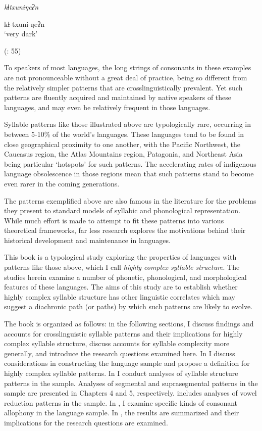 \ea\label{ex:1.5}

\textit{kɬtxuniŋeʔn}

kɬ-txuni-ŋeʔn\\
\glt ‘very dark’

(\citealt{GeorgVolodin1999}: 55)
\z

To speakers of most languages, the long strings of consonants in these examples are not pronounceable without a great deal of practice, being so different from the relatively simpler patterns that are crosslinguistically prevalent. Yet such patterns are fluently acquired and maintained by native speakers of these languages, and may even be relatively frequent in those languages.

  Syllable patterns like those illustrated above are typologically rare, occurring in between 5-10\% of the world’s languages. These languages tend to be found in close geographical proximity to one another, with the Pacific Northwest, the Caucasus region, the Atlas Mountains region, Patagonia, and Northeast Asia being particular ‘hotspots’ for such patterns. The accelerating rates of indigenous language obsolescence in those regions mean that such patterns stand to become even rarer in the coming generations.

  The patterns exemplified above are also famous in the literature for the problems they present to standard models of syllabic and phonological representation. While much effort is made to attempt to fit these patterns into various theoretical frameworks, far less research explores the motivations behind their historical development and maintenance in languages.

  This book is a typological study exploring the properties of languages with patterns like those above, which I call \textit{highly complex syllable structure}. The studies herein examine a number of phonetic, phonological, and morphological features of these languages. The aims of this study are to establish whether highly complex syllable structure has other linguistic correlates which may suggest a diachronic path (or paths) by which such patterns are likely to evolve.

  The book is organized as follows: in the following sections, I discuss findings and accounts for crosslinguistic syllable patterns and their implications for highly complex syllable structure, discuss accounts for syllable complexity more generally, and introduce the research questions examined here. In  I discuss considerations in constructing the language sample and propose a definition for highly complex syllable patterns. In  I conduct analyses of syllable structure patterns in the sample. Analyses of segmental and suprasegmental patterns in the sample are presented in Chapters 4 and 5, respectively.  includes analyses of vowel reduction patterns in the sample. In , I examine specific kinds of consonant allophony in the language sample. In , the results are summarized and their implications for the research questions are examined.

